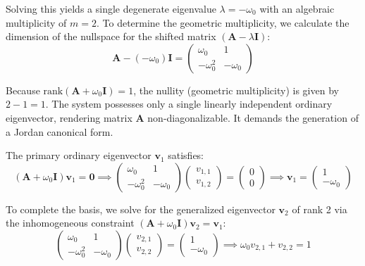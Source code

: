 \documentclass[11pt,preview]{article}
\begin{document}
Solving this yields a single degenerate eigenvalue $\lambda = -\omega_0$ with an algebraic multiplicity of $m = 2$. To determine the geometric multiplicity, we calculate the dimension of the nullspace for the shifted matrix $(\mathbf{A} - \lambda\mathbf{I})$:
\begin{equation}
    \mathbf{A} - (-\omega_0)\mathbf{I} = \begin{pmatrix} \omega_0 & 1 \\ -\omega_0^2 & -\omega_0 \end{pmatrix}
\end{equation}

Because $\text{rank}(\mathbf{A} + \omega_0\mathbf{I}) = 1$, the nullity (geometric multiplicity) is given by $2 - 1 = 1$. The system possesses only a single linearly independent ordinary eigenvector, rendering matrix $\mathbf{A}$ non-diagonalizable. It demands the generation of a Jordan canonical form.

The primary ordinary eigenvector $\mathbf{v}_1$ satisfies:
\begin{equation}
    (\mathbf{A} + \omega_0\mathbf{I})\mathbf{v}_1 = \mathbf{0} \implies \begin{pmatrix} \omega_0 & 1 \\ -\omega_0^2 & -\omega_0 \end{pmatrix} \begin{pmatrix} v_{1,1} \\ v_{1,2} \end{pmatrix} = \begin{pmatrix} 0 \\ 0 \end{pmatrix} \implies \mathbf{v}_1 = \begin{pmatrix} 1 \\ -\omega_0 \end{pmatrix}
\end{equation}

To complete the basis, we solve for the generalized eigenvector $\mathbf{v}_2$ of rank 2 via the inhomogeneous constraint $(\mathbf{A} + \omega_0\mathbf{I})\mathbf{v}_2 = \mathbf{v}_1$:
\begin{equation}
    \begin{pmatrix} \omega_0 & 1 \\ -\omega_0^2 & -\omega_0 \end{pmatrix} \begin{pmatrix} v_{2,1} \\ v_{2,2} \end{pmatrix} = \begin{pmatrix} 1 \\ -\omega_0 \end{pmatrix} \implies \omega_0 v_{2,1} + v_{2,2} = 1
\end{equation}
\end{document}
